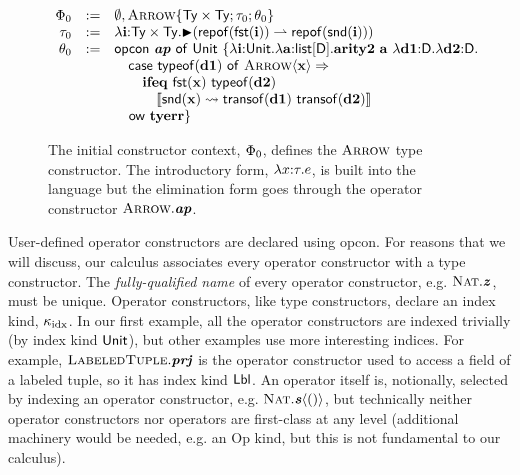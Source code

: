 \documentclass[9pt,preprint]{sigplanconf}
\begin{document}
\begin{figure}[t]
\small
\[
\begin{array}{rcl}
\Phi_0 & := & \emptyset, \fval{Arrow}{\kpair{\kTypeBlur}{\kTypeBlur}}{\tau_0}{\theta_0}\\
\tau_0 & := & \tlam{i}{\kpair{\kTypeBlur}{\kTypeBlur}}{\titype{\darrow{\trepof{\tfst{\tvar{i}}}}{\trepof{\tsnd{\tvar{i}}}}}}\\
\theta_0 & := & \tops{ap}{\kunit}{i}{a}{
	\tlam{i}{\kunit}{\tlam{a}{\klist{\kDen}}{
		\tvar{arity2}~\tvar{a}~\tlam{d1}{\kDen}{\tlam{d2}{\kDen}{
		\\& & \quad \tfamcase{\ttypeof{\tvar{d1}}}{Arrow}{x}{
		\\& & \quad\quad \tvar{ifeq}~\tfst{\tvar{x}}~\ttypeof{\tvar{d2}}
		\\& & \quad\quad\quad \tden{\itransof{\tvar{d1}}~\itransof{\tvar{d2}}}{\tsnd{\tvar{x}}}
		\\& & \quad\hspace{-3px}}{\tvar{tyerr}}
		}}
	}}
}
\end{array}
\]
\caption{\small The initial constructor context, $\Phi_0$, defines the $\textsc{Arrow}$ type constructor. The introductory form, $\lambda x{:}\tau.e$, is built into the language but the elimination form goes through the operator constructor $\textsc{Arrow}.\textbf{\textit{ap}}$.}
\label{arrow}
\end{figure}
User-defined operator constructors are declared using \textsf{opcon}.  For reasons that we will discuss, our calculus associates every operator  constructor with a type constructor. The \emph{fully-qualified name} of every operator constructor, e.g. $\textsc{Nat}.\textbf{\textit{z}}$, must be unique. Operator constructors, like type constructors, declare an index kind, $\kappa_{\text{idx}}$. In our first example, all the operator constructors are indexed trivially (by index kind ${\sf Unit}$), but other examples use more interesting indices. For example, $\textsc{LabeledTuple}.\textbf{\textit{prj}}$ is the operator constructor used to access a field of a labeled tuple, so it has index kind $\textsf{Lbl}$. An operator itself is, notionally, selected by indexing an operator constructor, e.g. $\textsc{Nat}.\textbf{\textit{s}}\langle () \rangle$, but technically neither operator constructors nor operators are first-class at any level (additional machinery would be needed, e.g. an \textsf{Op} kind, but this is not fundamental to our calculus). 
\end{document}

